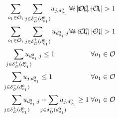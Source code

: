 \documentclass{article}
\begin{document}
\begin{alignat}{3}
    \label{mod:c11}        & \sum_{ \substack{o_1 \in \mathcal{O}_i }}{ \sum_{ j \in \delta^{-}_{D}(d^0_{o_1})}}{u_{j,d^0_{o_1} } } = |\mathcal{O}_i|-1                                                                                                                                                                       & \hspace{-20mm} \forall  i \in \mathcal{C},|\mathcal{O}_i| > 1                                    \\
    \label{mod:c12}        & \sum_{ \substack{o_1 \in \mathcal{O}_i }}\sum_{ j \in \delta^{+}_{D}(d^0_{o_1})}{u_{d^0_{o_1},j } } = |\mathcal{O}_i|-1                                                                                                                                                                          & \hspace{-40mm} \forall  i \in \mathcal{C}, |\mathcal{O}_i| > 1                                   \\
    \label{mod:c13}        & \hspace{3mm} \smashoperator{ \sum_{ j \in \delta^{+}_{D}(d^0_{o_1})}}{u_{d^0_{o_1},j } } \leq 1                                                                                                                                                                                                  & \hspace{-20mm}  \forall o_1 \in \mathcal{O}                                                      \\
    \label{mod:c14}        & \hspace{2mm} \smashoperator{ \sum_{ j \in \delta^{-}_{D}(d^0_{o_1})}}{u_{j,d^0_{o_1} } } \leq 1                                                                                                                                                                                                  & \hspace{-20mm} \forall o_1 \in \mathcal{O}                                                       \\
    \label{mod:c15}        & \hspace{2mm} \smashoperator{ \sum_{ j \in \delta^{+}_{D}(d^0_{o_1})}}{u_{d^0_{o_1},j } } +\smashoperator{ \sum_{ j \in \delta^{-}_{D}(d^0_{o_1})}}{u_{j,d^0_{o_1} } } \geq 1                                                                                                                     & \hspace{-20mm} \forall o_1 \in \mathcal{O}                                                       \\

\end{alignat}
\end{document}
